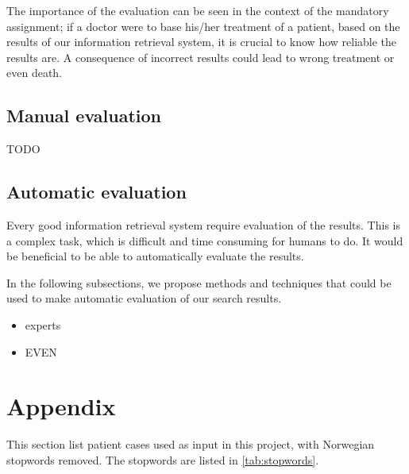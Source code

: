 \documentclass[a4paper, 12pt]{article}
\begin{document}
The importance of the evaluation can be seen in the context of the mandatory assignment; if a doctor were to base his/her treatment of a patient, based on the results of our information retrieval system, it is crucial to know how reliable the results are. A consequence of incorrect results could lead to wrong treatment or even death.

\subsection{Manual evaluation}
TODO

\subsection{Automatic evaluation}
Every good information retrieval system require evaluation of the results. This is a complex task, which is difficult and time consuming for humans to do. It would be beneficial to be able to automatically evaluate the results.

In the following subsections, we propose methods and techniques that could be used to make automatic evaluation of our search results.

\begin{itemize}
\item experts
\item EVEN
\end{itemize}


\appendix
\section{Appendix}
\label{appendix}
This section list patient cases used as input in this project, with Norwegian
stopwords removed. The stopwords are listed in \autoref{tab:stopwords}.


\end{document}
